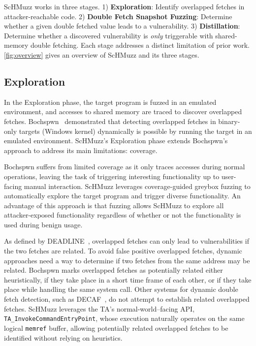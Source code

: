 \documentclass[conference]{IEEEtran}
\newcommand{\sysname}{ScHMuzz\xspace}
\newcommand{\stageone}{Exploration\xspace}
\newcommand{\stagetwo}{Double Fetch Snapshot Fuzzing\xspace}
\newcommand{\stagethree}{Distillation\xspace}
\begin{document}
\sysname works in three stages.
1) \textbf{\stageone}: Identify overlapped fetches in attacker-reachable code. 2) \textbf{\stagetwo}: Determine 
whether a given double fetched value leads to a vulnerability. 3) \textbf{\stagethree}: Determine whether 
a discovered vulnerability is \emph{only} triggerable with shared-memory double fetching.
Each stage addresses a distinct limitation of prior work. \autoref{fig:overview} gives an overview of \sysname 
and its three stages.

\subsection{\stageone}

In the \stageone phase, the target program is fuzzed in an emulated environment, 
and accesses to shared memory are traced to discover overlapped fetches. Bochspwn~\cite{bochspwn} 
demonstrated that detecting overlapped fetches in binary-only targets (Windows kernel) dynamically 
is possible by running the target in an emulated environment. 
\sysname's \stageone phase extends Bochspwn's approach to address its main limitations: coverage.

Bochspwn suffers from limited coverage as it only traces accesses during normal operations, 
leaving the task of triggering interesting functionality up to user-facing manual interaction.
\sysname leverages coverage-guided greybox fuzzing to automatically explore the target program 
and trigger diverse functionality. An advantage of this approach is that fuzzing allows \sysname 
to explore all attacker-exposed functionality regardless of whether or not the functionality is 
used during benign usage. 

As defined by DEADLINE~\cite{deadline}, overlapped fetches can only lead to vulnerabilities if 
the two fetches are related. To avoid false positive overlapped fetches, dynamic approaches need 
a way to determine if two fetches from the same address may be related.
Bochspwn marks overlapped fetches as potentially related either heuristically, if they take place in a short 
time frame of each other, or if they take place while handling the same system call. 
Other systems for dynamic double fetch detection, such as DECAF~\cite{decaf}, do not attempt to establish related overlapped fetches.
\sysname leverages the TA’s normal-world–facing API, \texttt{TA\_InvokeCommandEntryPoint}, 
whose execution naturally operates on the same logical \texttt{memref} buffer, allowing potentially 
related overlapped fetches to be identified without relying on heuristics.
\end{document}

